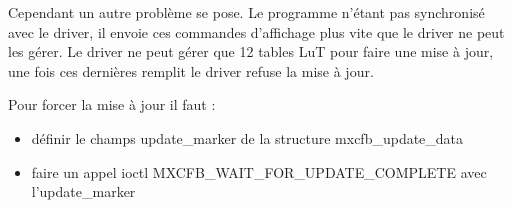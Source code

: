 Cependant un autre problème se pose. Le programme n'étant pas synchronisé avec le driver, il envoie ces commandes d'affichage plus vite que le driver ne peut les gérer.
Le driver ne peut gérer que 12 tables LuT pour faire une mise à jour, une fois ces dernières remplit le driver refuse la mise à jour.

Pour forcer la mise à jour il faut :
\begin{itemize}
	\item définir le champs update_marker de la structure mxcfb_update_data
	\item faire un appel ioctl MXCFB_WAIT_FOR_UPDATE_COMPLETE avec l'update_marker
\end{itemize}
